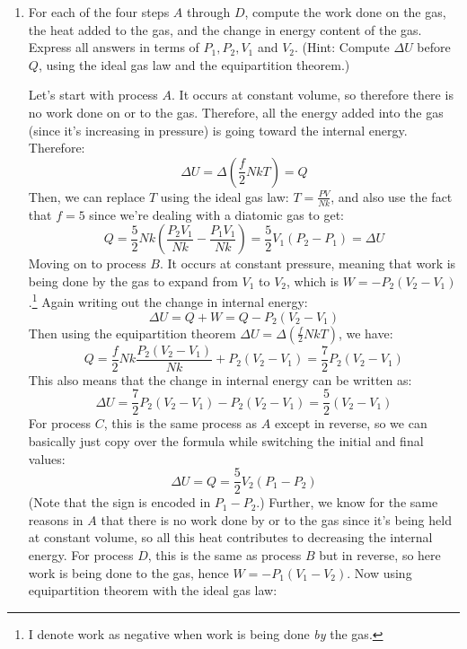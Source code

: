 \documentclass[11pt]{article}
\begin{document}
	\begin{enumerate}[label=\alph*)]
		\item For each of the four steps $A$ through $D$, compute the work done on the gas, the heat added to the
			gas, and the change in energy content of the gas. Express all answers in terms of $P_1, P_2, V_1$ 
			and $V_2$. (Hint: Compute $\Delta U$ before $Q$, using the ideal gas law and the equipartition
			theorem.)

			\begin{solution}
				Let's start with process $A$. It occurs at constant volume, so therefore there is no work 
				done on or to the gas. Therefore, all the energy added into the gas (since it's 
				increasing in pressure) is going toward the internal energy. Therefore:
				\[
				\Delta U = \Delta\left( \frac{f}{2}NkT \right) = Q
				\] 
				Then, we can replace $T$ using the ideal gas law: $T = \frac{PV}{Nk}$, and also use the 
				fact that $f = 5$ since we're dealing with a diatomic gas to get:
				\[
				Q = \frac{5}{2}Nk\left( \frac{P_2V_1}{Nk} - \frac{P_1V_1}{Nk}\right) = \frac{5}{2}V_1(P_2 - P_1) = \Delta U
				\] 
				Moving on to process $B$. It occurs at constant pressure, meaning that work is being done by the 
				gas to expand from $V_1$ to $V_2$, which is $W = -P_2(V_2 - V_1)$.\footnote{I denote work as 
				negative when work is being done \textit{by} the gas.}
				Again writing out the change in internal energy:
				\[
				\Delta U = Q + W = Q - P_2(V_2 - V_1)
				\] 
				Then using the equipartition theorem $\Delta U = \Delta\left( \frac{f}{2}NkT \right)$, 
				we have:
				\[
				Q = \frac{f}{2}Nk\frac{P_2(V_2 - V_1)}{Nk} + P_2(V_2 - V_1) = \frac{7}{2}P_2(V_2 - V_1)
				\] 
				This also means that the change in internal energy can be written as:
				\[
				\Delta U = \frac{7}{2}P_2(V_2 - V_1) - P_2(V_2 - V_1) = \frac{5}{2}(V_2 - V_1)
				\] 
				For process $C$, this is the same process as $A$ except in reverse, so we can 
				basically just copy over the formula while switching the initial and final values:
				\[
				\Delta U = Q = \frac{5}{2}V_2(P_1 - P_2)
				\] 
				(Note that the sign is encoded in $P_1 - P_2$.) Further, we know for the same reasons in $A$ that
				there is no work done by or to the gas since 
				it's being held at constant volume, so all this heat contributes to decreasing the internal
				energy. For process $D$, this is the same as process $B$ but in reverse, so here work is 
				being done to the gas, hence $W = -P_1(V_1 - V_2)$. Now using equipartition theorem with 
				the ideal gas law:
				\[
\]
\end{solution}
\end{enumerate}
\end{document}
